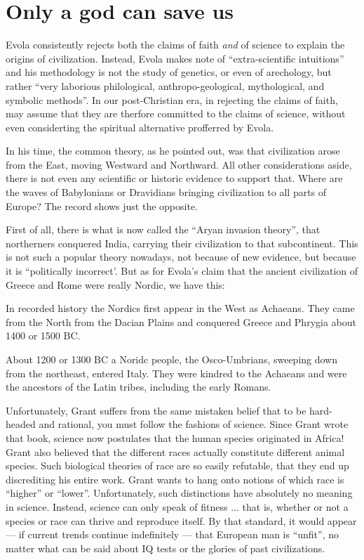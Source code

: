 \section{Only a god can save us}

Evola consistently rejects both the claims of faith \emph{and} of science to explain the origins of civilization. Instead, Evola makes note of ``extra-scientific intuitions'' and his methodology is not the study of genetics, or even of arechology, but rather ``very laborious philological, anthropo-geological, mythological, and symbolic methods''. In our post-Christian era, in rejecting the claims of faith, may assume that they are therfore committed to the claims of science, without even considerting the spiritual alternative profferred by Evola.

In his time, the common theory, as he pointed out, was that civilization arose from the East, moving Westward and Northward. All other considerations aside, there is not even any scientific or historic evidence to support that. Where are the waves of Babylonians or Dravidians bringing civilization to all parts of Europe? The record shows just the opposite.

First of all, there is what is now called the ``Aryan invasion theory'', that northerners conquered India, carrying their civilization to that subcontinent. This is not such a popular theory nowadays, not because of new evidence, but because it is ``politically incorrect'. But as for Evola's claim that the ancient civilization of Greece and Rome were really Nordic, we have this:

\begin{quotationx}
In recorded history the Nordics first appear in the West as Achaeans. They came from the North from the Dacian Plains and conquered Greece and Phrygia about 1400 or 1500 BC.

About 1200 or 1300 BC a Noridc people, the Osco-Umbrians, sweeping down from the northeast, entered Italy. They were kindred to the Achaeans and were the ancestors of the Latin tribes, including the early Romans.

\end{quotationx}


Unfortunately, Grant suffers from the same mistaken belief that to be hard-headed and rational, you must follow the fashions of science. Since Grant wrote that book, science now postulates that the human species originated in Africa! Grant also believed that the different races actually constitute different animal species. Such biological theories of race are so easily refutable, that they end up discrediting his entire work. Grant wants to hang onto notions of which race is ``higher'' or ``lower''. Unfortunately, such distinctions have absolutely no meaning in science. Instead, science can only speak of fitness ... that is, whether or not a species or race can thrive and reproduce itself. By that standard, it would appear --- if current trends continue indefinitely --- that European man is ``unfit'', no matter what can be said about IQ tests or the glories of past civilizations.

